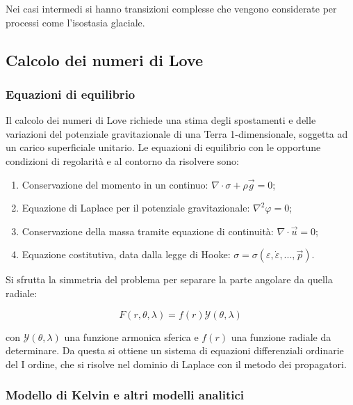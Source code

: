 \documentclass[a4paper,12pt]{book}
\begin{document}
\noindent
Nei casi intermedi si hanno transizioni complesse che vengono considerate per processi come l'isostasia glaciale.\\

\subsection{\textcolor{colore7}{Calcolo dei numeri di Love}}

\subsubsection{\textcolor{colore7}{Equazioni di equilibrio}}

Il calcolo dei numeri di Love richiede una stima degli spostamenti e delle variazioni del potenziale gravitazionale di una Terra 1-dimensionale,
soggetta ad un carico superficiale unitario.
Le equazioni di equilibrio con le opportune condizioni di regolarità e al contorno da risolvere sono:

\begin{enumerate}
    \item Conservazione del momento in un continuo: $\nabla \cdot \sigma + \rho \vec{g} = 0$;
    \item Equazione di Laplace per il potenziale gravitazionale: $\nabla^2 \varphi = 0$;
    \item Conservazione della massa tramite equazione di continuità: $\nabla \cdot \vec{u} = 0$;
    \item Equazione costitutiva, data dalla legge di Hooke: $\sigma = \sigma (\varepsilon, \dot{\varepsilon}, ..., \vec{p})$.
\end{enumerate}

\noindent
Si sfrutta la simmetria del problema per separare la parte angolare da quella radiale:

\begin{equation}
    F(r, \theta, \lambda) = f(r) \mathcal{Y} (\theta, \lambda)
\end{equation}

\noindent
con $\mathcal{Y} (\theta, \lambda) $ una funzione armonica sferica e $f(r)$ una funzione radiale da determinare.
Da questa si ottiene un sistema di equazioni differenziali ordinarie del I ordine,
che si risolve nel dominio di Laplace con il metodo dei propagatori.

\subsubsection{\textcolor{colore7}{Modello di Kelvin e altri modelli analitici}}
\end{document}
